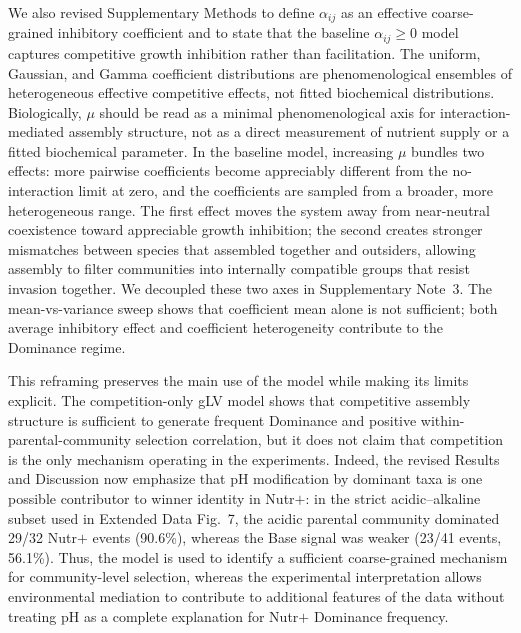 We also revised Supplementary Methods to define $\alpha_{ij}$ as an effective coarse-grained inhibitory coefficient and to state that the baseline $\alpha_{ij}\geq 0$ model captures competitive growth inhibition rather than facilitation. The uniform, Gaussian, and Gamma coefficient distributions are phenomenological ensembles of heterogeneous effective competitive effects, not fitted biochemical distributions. Biologically, $\mu$ should be read as a minimal phenomenological axis for interaction-mediated assembly structure, not as a direct measurement of nutrient supply or a fitted biochemical parameter. In the baseline model, increasing $\mu$ bundles two effects: more pairwise coefficients become appreciably different from the no-interaction limit at zero, and the coefficients are sampled from a broader, more heterogeneous range. The first effect moves the system away from near-neutral coexistence toward appreciable growth inhibition; the second creates stronger mismatches between species that assembled together and outsiders, allowing assembly to filter communities into internally compatible groups that resist invasion together. We decoupled these two axes in Supplementary Note~3. The mean-vs-variance sweep shows that coefficient mean alone is not sufficient; both average inhibitory effect and coefficient heterogeneity contribute to the Dominance regime.

This reframing preserves the main use of the model while making its limits explicit. The competition-only gLV model shows that competitive assembly structure is sufficient to generate frequent Dominance and positive within-parental-community selection correlation, but it does not claim that competition is the only mechanism operating in the experiments. Indeed, the revised Results and Discussion now emphasize that pH modification by dominant taxa is one possible contributor to winner identity in Nutr$+$: in the strict acidic--alkaline subset used in Extended Data Fig.~7, the acidic parental community dominated 29/32 Nutr$+$ events (90.6\%), whereas the Base signal was weaker (23/41 events, 56.1\%). Thus, the model is used to identify a sufficient coarse-grained mechanism for community-level selection, whereas the experimental interpretation allows environmental mediation to contribute to additional features of the data without treating pH as a complete explanation for Nutr$+$ Dominance frequency.

